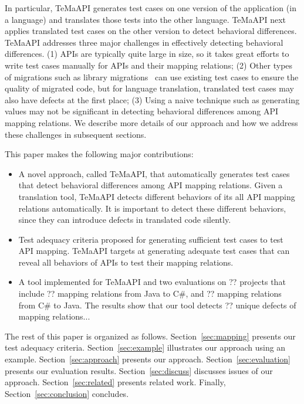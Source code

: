 In particular, TeMaAPI generates test cases on one version of the application (in a language) and translates those tests into the other language. TeMaAPI next applies translated test cases on the other version to detect behavioral differences. TeMaAPI addresses three major challenges in effectively detecting behavioral differences. (1) APIs are typically quite large in size, so it takes great efforts to write test cases manually for APIs and their mapping relations; (2) Other types of migrations such as library migrations~\cite{nita2010using} can use existing test cases to ensure the quality of migrated code, but for language translation, translated test cases may also have defects at the first place; (3) Using a naive technique such as generating  values may not be significant in detecting behavioral differences among API mapping relations. We describe more details of our approach and how we address these challenges in subsequent sections.

This paper makes the following major contributions:

\begin{itemize}\vspace*{-1.5ex}
\item A novel approach, called TeMaAPI, that automatically generates test cases that detect behavioral differences among API mapping relations. Given a translation tool, TeMaAPI detects different behaviors of its all API mapping relations automatically. It is important to detect these different behaviors, since they can introduce defects in translated code silently.\vspace*{-1.5ex}
\item Test adequacy criteria proposed for generating sufficient test cases to test API mapping. TeMaAPI targets at generating adequate test cases that can reveal all behaviors of APIs to test their mapping relations.\vspace*{-1.5ex}
\item A tool implemented for TeMaAPI and two evaluations on ?? projects that include ?? mapping relations from Java to C\#, and ?? mapping relations from C\# to Java. The results show that our tool detects ?? unique defects of mapping relations...
\end{itemize}\vspace*{-1.5ex}

The rest of this paper is organized as follows.
Section~\ref{sec:mapping} presents our test adequacy criteria.
Section~\ref{sec:example} illustrates our approach using an example.
Section~\ref{sec:approach} presents our approach.
Section~\ref{sec:evaluation} presents our evaluation results.
Section~\ref{sec:discuss} discusses issues of our approach.
Section~\ref{sec:related} presents related work.
Finally, Section~\ref{sec:conclusion} concludes.


